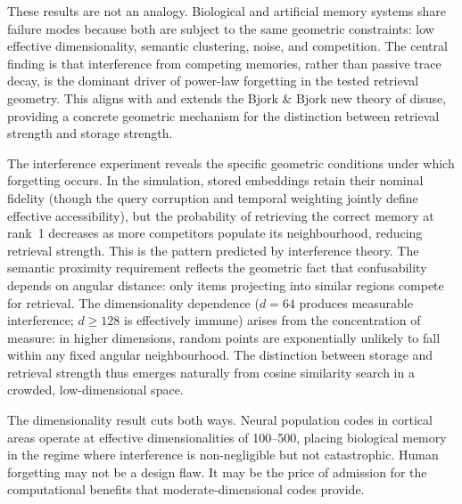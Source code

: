 \documentclass[11pt]{article}
\begin{document}
These results are not an analogy. Biological and artificial memory systems share failure modes because both are subject to the same geometric constraints: low effective dimensionality, semantic clustering, noise, and competition. The central finding is that interference from competing memories, rather than passive trace decay, is the dominant driver of power-law forgetting in the tested retrieval geometry. This aligns with and extends the Bjork \& Bjork new theory of disuse\cite{bjork1992}, providing a concrete geometric mechanism for the distinction between retrieval strength and storage strength.

The interference experiment reveals the specific geometric conditions under which forgetting occurs. In the simulation, stored embeddings retain their nominal fidelity (though the query corruption and temporal weighting jointly define effective accessibility), but the probability of retrieving the correct memory at rank~1 decreases as more competitors populate its neighbourhood, reducing retrieval strength. This is the pattern predicted by interference theory\cite{anderson1991}. The semantic proximity requirement reflects the geometric fact that confusability depends on angular distance: only items projecting into similar regions compete for retrieval. The dimensionality dependence ($d = 64$ produces measurable interference; $d \geq 128$ is effectively immune) arises from the concentration of measure: in higher dimensions, random points are exponentially unlikely to fall within any fixed angular neighbourhood. The distinction between storage and retrieval strength thus emerges naturally from cosine similarity search in a crowded, low-dimensional space.

The dimensionality result cuts both ways. Neural population codes in cortical areas operate at effective dimensionalities of 100--500\cite{stringer2019,gao2017}, placing biological memory in the regime where interference is non-negligible but not catastrophic. Human forgetting may not be a design flaw. It may be the price of admission for the computational benefits that moderate-dimensional codes provide.
\end{document}
